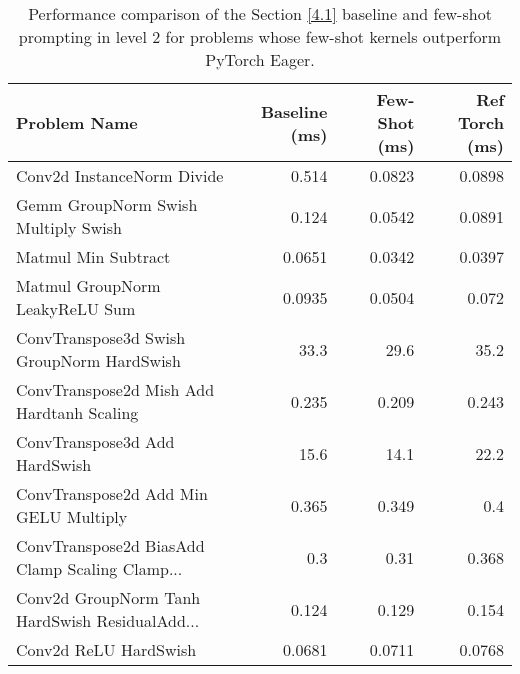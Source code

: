 \begin{table}[H]
\centering
\label{tab:few_shot_kernel_fusion_results_level2}
\begin{tabular}{lrrr}
\toprule
\textbf{Problem Name} & \textbf{Baseline (ms)} & \textbf{Few-Shot (ms)} & \textbf{Ref Torch (ms)} \\
\midrule
Conv2d InstanceNorm Divide & 0.514 & 0.0823 & 0.0898 \\
Gemm GroupNorm Swish Multiply Swish & 0.124 & 0.0542 & 0.0891 \\
Matmul Min Subtract & 0.0651 & 0.0342 & 0.0397 \\
Matmul GroupNorm LeakyReLU Sum & 0.0935 & 0.0504 & 0.072 \\
ConvTranspose3d Swish GroupNorm HardSwish & 33.3 & 29.6 & 35.2 \\
ConvTranspose2d Mish Add Hardtanh Scaling & 0.235 & 0.209 & 0.243 \\
ConvTranspose3d Add HardSwish & 15.6 & 14.1 & 22.2 \\
ConvTranspose2d Add Min GELU Multiply & 0.365 & 0.349 & 0.4 \\
ConvTranspose2d BiasAdd Clamp Scaling Clamp... & 0.3 & 0.31 & 0.368 \\
Conv2d GroupNorm Tanh HardSwish ResidualAdd... & 0.124 & 0.129	& 0.154 \\
Conv2d ReLU HardSwish & 0.0681 & 0.0711 & 0.0768 \\
\bottomrule
\end{tabular}
\caption{Performance comparison of the Section \ref{4.1} baseline and few-shot prompting in level 2 for problems whose few-shot kernels outperform PyTorch Eager.}
\end{table}